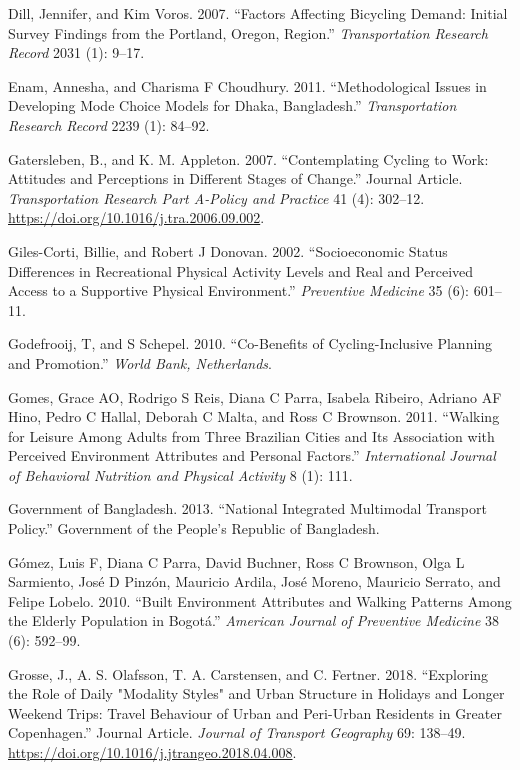 \documentclass[]{elsarticle} %
\begin{document}
\leavevmode\hypertarget{ref-dill2007factors}{}%
Dill, Jennifer, and Kim Voros. 2007. ``Factors Affecting Bicycling
Demand: Initial Survey Findings from the Portland, Oregon, Region.''
\emph{Transportation Research Record} 2031 (1): 9--17.

\leavevmode\hypertarget{ref-Enam2011methodological}{}%
Enam, Annesha, and Charisma F Choudhury. 2011. ``Methodological Issues
in Developing Mode Choice Models for Dhaka, Bangladesh.''
\emph{Transportation Research Record} 2239 (1): 84--92.

\leavevmode\hypertarget{ref-Gatersleben2007contemplating}{}%
Gatersleben, B., and K. M. Appleton. 2007. ``Contemplating Cycling to
Work: Attitudes and Perceptions in Different Stages of Change.'' Journal
Article. \emph{Transportation Research Part A-Policy and Practice} 41
(4): 302--12. \url{https://doi.org/10.1016/j.tra.2006.09.002}.

\leavevmode\hypertarget{ref-giles2002socioeconomic}{}%
Giles-Corti, Billie, and Robert J Donovan. 2002. ``Socioeconomic Status
Differences in Recreational Physical Activity Levels and Real and
Perceived Access to a Supportive Physical Environment.''
\emph{Preventive Medicine} 35 (6): 601--11.

\leavevmode\hypertarget{ref-godefrooij2010co}{}%
Godefrooij, T, and S Schepel. 2010. ``Co-Benefits of Cycling-Inclusive
Planning and Promotion.'' \emph{World Bank, Netherlands}.

\leavevmode\hypertarget{ref-gomes2011walking}{}%
Gomes, Grace AO, Rodrigo S Reis, Diana C Parra, Isabela Ribeiro, Adriano
AF Hino, Pedro C Hallal, Deborah C Malta, and Ross C Brownson. 2011.
``Walking for Leisure Among Adults from Three Brazilian Cities and Its
Association with Perceived Environment Attributes and Personal
Factors.'' \emph{International Journal of Behavioral Nutrition and
Physical Activity} 8 (1): 111.

\leavevmode\hypertarget{ref-bangla2013policy}{}%
Government of Bangladesh. 2013. ``National Integrated Multimodal
Transport Policy.'' Government of the People's Republic of Bangladesh.

\leavevmode\hypertarget{ref-gomez2010built}{}%
Gómez, Luis F, Diana C Parra, David Buchner, Ross C Brownson, Olga L
Sarmiento, José D Pinzón, Mauricio Ardila, José Moreno, Mauricio
Serrato, and Felipe Lobelo. 2010. ``Built Environment Attributes and
Walking Patterns Among the Elderly Population in Bogotá.''
\emph{American Journal of Preventive Medicine} 38 (6): 592--99.

\leavevmode\hypertarget{ref-Grosse2018exploring}{}%
Grosse, J., A. S. Olafsson, T. A. Carstensen, and C. Fertner. 2018.
``Exploring the Role of Daily "Modality Styles" and Urban Structure in
Holidays and Longer Weekend Trips: Travel Behaviour of Urban and
Peri-Urban Residents in Greater Copenhagen.'' Journal Article.
\emph{Journal of Transport Geography} 69: 138--49.
\url{https://doi.org/10.1016/j.jtrangeo.2018.04.008}.
\end{document}
